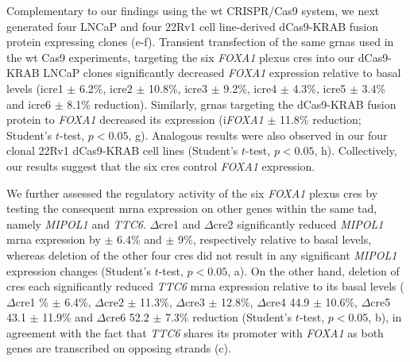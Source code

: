 Complementary to our findings using the \gls{wt} CRISPR/Cas9 system, we next generated four LNCaP and four 22Rv1 cell line-derived dCas9-KRAB fusion protein expressing clones (e-f).
Transient transfection of the same \glspl{grna} used in the \gls{wt} Cas9 experiments, targeting the six \emph{FOXA1} plexus \glspl{cre} into our dCas9-KRAB LNCaP clones significantly decreased \emph{FOXA1} expression relative to basal levels (i\gls{cre}1  $\pm$ 6.2\%, i\gls{cre}2  $\pm$ 10.8\%, i\gls{cre}3  $\pm$ 9.2\%, i\gls{cre}4  $\pm$ 4.3\%, i\gls{cre}5  $\pm$ 3.4\% and i\gls{cre}6  $\pm$ 8.1\% reduction).
Similarly, \glspl{grna} targeting the dCas9-KRAB fusion protein to \emph{FOXA1} decreased its expression (i\emph{FOXA1}  $\pm$ 11.8\% reduction; Student's $t$-test, $p<0.05$, g).
Analogous results were also observed in our four clonal 22Rv1 dCas9-KRAB cell lines (Student's $t$-test, $p<0.05$, h).
Collectively, our results suggest that the six \glspl{cre} control \emph{FOXA1} expression.

We further assessed the regulatory activity of the six \emph{FOXA1} plexus \glspl{cre} by testing the consequent \gls{mrna} expression on other genes within the same \gls{tad}, namely \emph{MIPOL1} and \emph{TTC6}.
$\Delta$\gls{cre}1 and $\Delta$\gls{cre}2 significantly reduced \emph{MIPOL1} \gls{mrna} expression by  $\pm$ 6.4\% and  $\pm$ 9\%, respectively relative to basal levels, whereas deletion of the other four \glspl{cre} did not result in any significant \emph{MIPOL1} expression changes (Student's $t$-test, $p<0.05$, a).
On the other hand, deletion of \glspl{cre} each significantly reduced \emph{TTC6} \gls{mrna} expression relative to its basal levels ($\Delta$\gls{cre}1 \% $\pm$ 6.4\%, $\Delta$\gls{cre}2  $\pm$ 11.3\%, $\Delta$\gls{cre}3  $\pm$ 12.8\%, $\Delta$\gls{cre}4 44.9 $\pm$ 10.6\%, $\Delta$\gls{cre}5 43.1 $\pm$ 11.9\% and $\Delta$\gls{cre}6 52.2 $\pm$ 7.3\% reduction (Student's $t$-test, $p<0.05$, b), in agreement with the fact that \emph{TTC6} shares its promoter with \emph{FOXA1} as both genes are transcribed on opposing strands (c).

